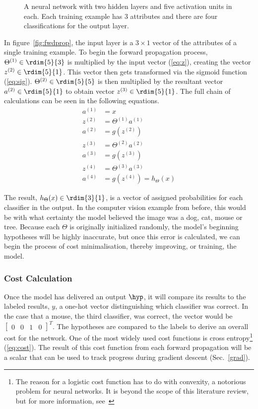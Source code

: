 \begin{figure}[h]
  \caption{A neural network with two hidden layers and five activation units in each. Each training example has 3 attributes and there are four classifications for the output layer.}
\end{figure}

In figure~\ref{fig:fwdprop}, the input layer is a $3\times 1$ vector of the attributes of a single training example. To begin the forward propagation process, $\Theta^{(1)} \in \rdim{5}{3}$ is multiplied by the input vector (\ref{eq:z}), creating the vector $z^{(2)} \in \rdim{5}{1}$. This vector then gets transformed via the sigmoid function (\ref{eq:sig}). $\Theta^{(2)} \in \rdim{5}{5}$ is then multiplied by the resultant vector $a^{(2)} \in \rdim{5}{1}$ to obtain vector $z^{(3)} \in \rdim{5}{1}$.  The full chain of calculations can be seen in the following equations.
\begin{align*}
  a^{(1)} &= x \\
  z^{(2)} &= \Theta^{(1)}a^{(1)} \\
  a^{(2)} &= g(z^{(2)}) \\
  z^{(3)} &= \Theta^{(2)}a^{(2)} \\
  a^{(3)} &= g(z^{(3)}) \\
  z^{(4)} &= \Theta^{(3)}a^{(3)} \\
  a^{(4)} &= g(z^{(4)}) = h_\Theta(x)
\end{align*}

The result, $h_\Theta(x) \in \rdim{3}{1}$, is a vector of assigned probabilities for each classifier in the output. In the computer vision example from before, this would be with what certainty the model believed the image was a dog, cat, mouse or tree. Because each $\Theta$ is originally initialized randomly, the model's beginning hypotheses will be highly inaccurate, but once this error is calculated, we can begin the process of cost minimalisation, thereby improving, or training, the model.


\subsubsection{Cost Calculation} \label{costcalc}

Once the model has delivered an output $\hyp$, it will compare its results to the labeled results, $y$, a one-hot vector distinguishing which classifier was correct. In the case that a mouse, the third classifier, was correct, the vector would be $\begin{bmatrix} 0 & 0 & 1 & 0 \end{bmatrix}^T$. The hypotheses are compared to the labels to derive an overall cost for the network.  One of the most widely used cost functions is cross entropy\footnote{The reason for a logistic cost function has to do with convexity, a notorious problem for neural networks. It is beyond the scope of this literature review, but for more information, see~\cite{Nielsen2015}} (\ref{eq:cost}). The result of this cost function from each forward propagation will be a scalar that can be used to track progress during gradient descent (Sec.~\ref{grad}).

